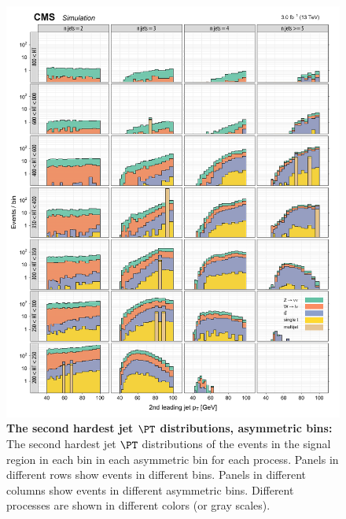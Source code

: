 \begin{figure}[!h]
\centering
\includegraphics[scale=0.95]{figures/kiplots/c150107_s150318_f015_jet_pt_1_40}
\caption{\textbf{\boldmath The second hardest jet $\PT$ distributions,
asymmetric \njet bins:} The second hardest jet $\PT$ distributions of
the events in the signal region in each \scalht bin in each asymmetric
\njet bin for each process. Panels in different rows show events in
different \scalht bins. Panels in different columns show events in
different asymmetric \njet bins. Different processes are shown in
different colors (or gray scales).}
\label{c150107_s150318_f015_jet_pt_1_40}
\end{figure}

